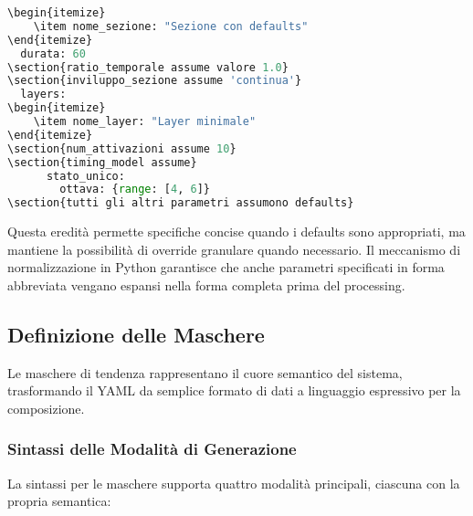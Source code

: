 \begin{lstlisting}[language=Python]
\begin{itemize}
    \item nome_sezione: "Sezione con defaults"
\end{itemize}
  durata: 60
\section{ratio_temporale assume valore 1.0}
\section{inviluppo_sezione assume 'continua'}
  layers:
\begin{itemize}
    \item nome_layer: "Layer minimale"
\end{itemize}
\section{num_attivazioni assume 10}
\section{timing_model assume}
      stato_unico:
        ottava: {range: [4, 6]}
\section{tutti gli altri parametri assumono defaults}
\end{lstlisting}

Questa eredità permette specifiche concise quando i defaults sono appropriati, ma mantiene la possibilità di override granulare quando necessario. Il meccanismo di normalizzazione in Python garantisce che anche parametri specificati in forma abbreviata vengano espansi nella forma completa prima del processing.
\subsection{Definizione delle Maschere}
Le maschere di tendenza rappresentano il cuore semantico del sistema, trasformando il YAML da semplice formato di dati a linguaggio espressivo per la composizione.
\subsubsection{Sintassi delle Modalità di Generazione}
La sintassi per le maschere supporta quattro modalità principali, ciascuna con la propria semantica:

